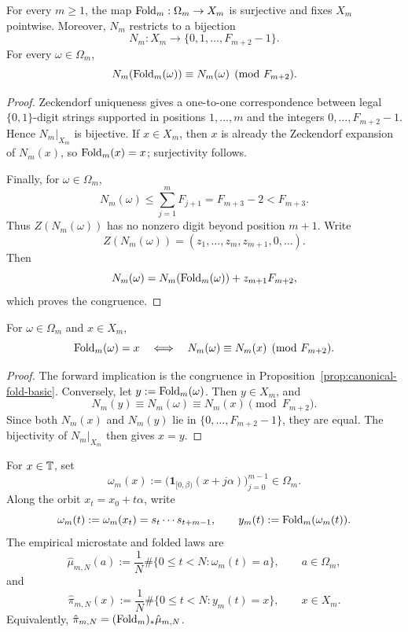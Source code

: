 \begin{proposition}\label{prop:canonical-fold-basic}
For every \(m\ge 1\), the map \(\mathrm{Fold}_m:\Omega_m\to X_m\) is surjective and
fixes \(X_m\) pointwise. Moreover, \(N_m\) restricts to a bijection
\[
N_m:X_m\longrightarrow \{0,1,\dots,F_{m+2}-1\}.
\]
For every \(\omega\in\Omega_m\),
\[
N_m(\mathrm{Fold}_m(\omega))\equiv N_m(\omega)\pmod {F_{m+2}}.
\]
\end{proposition}

\begin{proof}
Zeckendorf uniqueness \cite{Zeckendorf1972} gives a one-to-one correspondence
between legal \(\{0,1\}\)-digit strings supported in positions \(1,\dots,m\)
and the integers \(0,\dots,F_{m+2}-1\). Hence \(N_m|_{X_m}\) is bijective. If
\(x\in X_m\), then \(x\) is already the Zeckendorf expansion of \(N_m(x)\), so
\(\mathrm{Fold}_m(x)=x\); surjectivity follows.

Finally, for \(\omega\in\Omega_m\),
\[
N_m(\omega)\le \sum_{j=1}^m F_{j+1}=F_{m+3}-2<F_{m+3}.
\]
Thus \(Z(N_m(\omega))\) has no nonzero digit beyond position \(m+1\). Write
\[
Z(N_m(\omega))=(z_1,\dots,z_m,z_{m+1},0,\dots).
\]
Then
\[
N_m(\omega)=N_m(\mathrm{Fold}_m(\omega))+z_{m+1}F_{m+2},
\]
which proves the congruence.
\end{proof}

\begin{proposition}\label{prop:fold-residue-characterization}
For \(\omega\in\Omega_m\) and \(x\in X_m\),
\[
\mathrm{Fold}_m(\omega)=x
\quad\Longleftrightarrow\quad
N_m(\omega)\equiv N_m(x)\pmod {F_{m+2}}.
\]
\end{proposition}

\begin{proof}
The forward implication is the congruence in
Proposition~\ref{prop:canonical-fold-basic}. Conversely, let
\(y:=\mathrm{Fold}_m(\omega)\). Then \(y\in X_m\), and
\[
N_m(y)\equiv N_m(\omega)\equiv N_m(x)\pmod {F_{m+2}}.
\]
Since both \(N_m(x)\) and \(N_m(y)\) lie in
\(\{0,\dots,F_{m+2}-1\}\), they are equal. The bijectivity of \(N_m|_{X_m}\)
then gives \(x=y\).
\end{proof}

\begin{definition}\label{def:microstates-folded-histograms}
For \(x\in\mathbb{T}\), set
\[
\omega_m(x):=\bigl(\mathbf{1}_{[0,\beta)}(x+j\alpha)\bigr)_{j=0}^{m-1}
\in\Omega_m.
\]
Along the orbit \(x_t=x_0+t\alpha\), write
\[
\omega_m(t):=\omega_m(x_t)=s_t\cdots s_{t+m-1},
\qquad
y_m(t):=\mathrm{Fold}_m(\omega_m(t)).
\]
The empirical microstate and folded laws are
\[
\hat\mu_{m,N}(a):=\frac1N\#\{0\le t<N:\omega_m(t)=a\},
\qquad a\in\Omega_m,
\]
and
\[
\hat\pi_{m,N}(x):=\frac1N\#\{0\le t<N:y_m(t)=x\},
\qquad x\in X_m.
\]
Equivalently, \(\hat\pi_{m,N}=(\mathrm{Fold}_m)_*\hat\mu_{m,N}\).
\end{definition}

